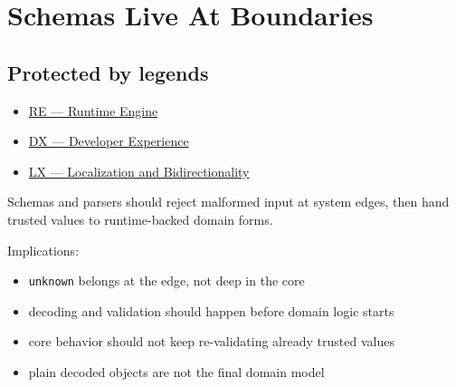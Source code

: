 \chapter{Schemas Live At Boundaries}\label{record-056}

\smallskip

\section{Protected by legends}\label{record-056-protected-by-legends}

\begin{itemize}
\tightlist
\item
  \href{https://github.com/flyingrobots/bijou/blob/1853ad902f6bf219326409e7f743a5a1d6517dbc/docs/legends/RE-runtime-engine.md}{RE --- Runtime Engine}
\item
  \href{https://github.com/flyingrobots/bijou/blob/1853ad902f6bf219326409e7f743a5a1d6517dbc/docs/legends/DX-developer-experience.md}{DX --- Developer Experience}
\item
  \href{https://github.com/flyingrobots/bijou/blob/1853ad902f6bf219326409e7f743a5a1d6517dbc/docs/legends/LX-localization-and-bidirectionality.md}{LX --- Localization and Bidirectionality}
\end{itemize}

Schemas and parsers should reject malformed input at system edges, then hand trusted values to runtime-backed domain forms.

Implications:

\begin{itemize}
\tightlist
\item
  \texttt{u\allowbreak{}n\allowbreak{}k\allowbreak{}n\allowbreak{}o\allowbreak{}w\allowbreak{}n} belongs at the edge, not deep in the core
\item
  decoding and validation should happen before domain logic starts
\item
  core behavior should not keep re-validating already trusted values
\item
  plain decoded objects are not the final domain model
\end{itemize}

